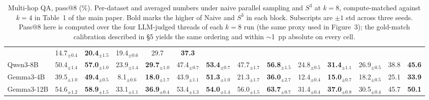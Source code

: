 \begin{table}[t]
\begin{tabular}{l *{10}{c} c *{2}{c}}
& \cellcolor{naivetint}14.7$_{\pm 0.4}$ & \cellcolor{s3tint}\textbf{20.4}$_{\pm 1.5}$
& 19.4$_{\pm 0.6}$ & \cellcolor{naivetint}29.7 & \cellcolor{s3tint}\textbf{37.3} \\
Qwen3-8B
& \cellcolor{naivetint}50.4$_{\pm 1.4}$ & \cellcolor{s3tint}\textbf{57.0}$_{\pm 1.0}$
& \cellcolor{naivetint}23.9$_{\pm 1.4}$ & \cellcolor{s3tint}\textbf{29.7}$_{\pm 1.0}$
& \cellcolor{naivetint}47.4$_{\pm 0.7}$ & \cellcolor{s3tint}\textbf{53.4}$_{\pm 0.7}$
& \cellcolor{naivetint}47.7$_{\pm 1.7}$ & \cellcolor{s3tint}\textbf{56.8}$_{\pm 1.5}$
& \cellcolor{naivetint}24.8$_{\pm 0.5}$ & \cellcolor{s3tint}\textbf{31.4}$_{\pm 1.1}$
& 26.9$_{\pm 0.5}$ & \cellcolor{naivetint}38.8 & \cellcolor{s3tint}\textbf{45.6} \\
Gemma3-4B
& \cellcolor{naivetint}39.5$_{\pm 1.0}$ & \cellcolor{s3tint}\textbf{49.4}$_{\pm 0.5}$
& \cellcolor{naivetint}8.1$_{\pm 0.6}$ & \cellcolor{s3tint}\textbf{18.0}$_{\pm 1.7}$
& \cellcolor{naivetint}43.9$_{\pm 1.1}$ & \cellcolor{s3tint}\textbf{51.3}$_{\pm 1.0}$
& \cellcolor{naivetint}21.3$_{\pm 1.7}$ & \cellcolor{s3tint}\textbf{36.0}$_{\pm 2.7}$
& \cellcolor{naivetint}12.4$_{\pm 0.4}$ & \cellcolor{s3tint}\textbf{15.0}$_{\pm 0.7}$
& 18.2$_{\pm 0.5}$ & \cellcolor{naivetint}25.1 & \cellcolor{s3tint}\textbf{33.9} \\
Gemma3-12B
& \cellcolor{naivetint}54.6$_{\pm 1.2}$ & \cellcolor{s3tint}\textbf{58.9}$_{\pm 1.5}$
& \cellcolor{naivetint}33.1$_{\pm 1.1}$ & \cellcolor{s3tint}\textbf{36.9}$_{\pm 0.4}$
& \cellcolor{naivetint}53.4$_{\pm 1.3}$ & \cellcolor{s3tint}\textbf{54.0}$_{\pm 1.4}$
& \cellcolor{naivetint}56.0$_{\pm 1.5}$ & \cellcolor{s3tint}\textbf{63.7}$_{\pm 0.7}$
& \cellcolor{naivetint}31.4$_{\pm 0.4}$ & \cellcolor{s3tint}\textbf{37.0}$_{\pm 0.8}$
& 30.5$_{\pm 0.4}$ & \cellcolor{naivetint}45.7 & \cellcolor{s3tint}\textbf{50.1} \\
\bottomrule
\end{tabular}
\caption{Multi-hop QA, pass@8 (\%). Per-dataset and averaged
numbers under naive parallel sampling and $S^3$ at $k{=}8$,
compute-matched against $k{=}4$ in Table~1 of the main paper.
Bold marks the higher of Naive and $S^3$ in each block.
Subscripts are $\pm 1$ std across three seeds. Pass@8 here is
computed over the four LLM-judged threads of each $k{=}8$ run
(the same proxy used in Figure~3); the gold-match calibration
described in \S5 yields the same ordering and within $\sim$1~pp
absolute on every cell.}
\label{tab:app-passk8-mhqa}
\end{table}

